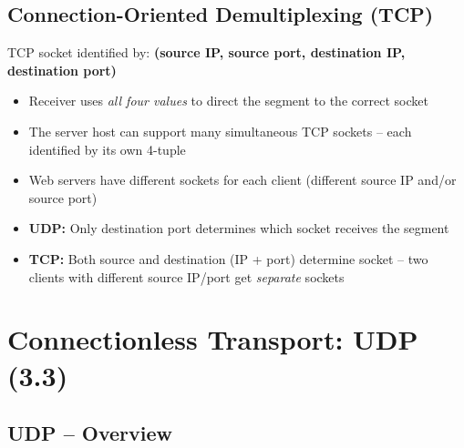 \subsection{Connection-Oriented Demultiplexing (TCP)}

\begin{keybox}
TCP socket identified by: \textbf{(source IP, source port, destination IP, destination port)}
\begin{itemize}[noitemsep]
    \item Receiver uses \emph{all four values} to direct the segment to the correct socket
    \item The server host can support many simultaneous TCP sockets -- each identified by its own 4-tuple
    \item Web servers have different sockets for each client (different source IP and/or source port)
\end{itemize}
\end{keybox}

\begin{warnbox}
\begin{itemize}[noitemsep]
    \item \textbf{UDP:} Only destination port determines which socket receives the segment
    \item \textbf{TCP:} Both source and destination (IP + port) determine socket -- two clients with different source IP/port get \emph{separate} sockets
\end{itemize}
\end{warnbox}

\begin{imagebox}
\end{imagebox}

\section{Connectionless Transport: UDP (3.3)}

\subsection{UDP -- Overview}

